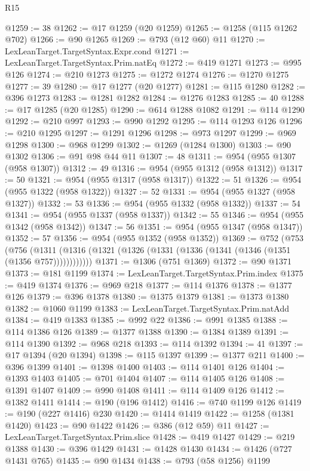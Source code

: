 \begin{lexlean}{R15}
\begin{coremodule}
@1259 := 38
@1262 := @17 @1259 (@20 @1259)
@1265 := @1258 (@115 @1262 @702)
@1266 := @90 @1265
@1269 := @793 (@12 @60) @11
@1270 := LexLeanTarget.TargetSyntax.Expr.cond
@1271 := LexLeanTarget.TargetSyntax.Prim.natEq
@1272 := @419 @1271
@1273 := @995 @126
@1274 := @210 @1273
@1275 := @1272 @1274
@1276 := @1270 @1275
@1277 := 39
@1280 := @17 @1277 (@20 @1277)
@1281 := @115 @1280
@1282 := @396 @1273
@1283 := @1281 @1282
@1284 := @1276 @1283
@1285 := 40
@1288 := @17 @1285 (@20 @1285)
@1290 := @614 @1288 @1082
@1291 := @114 @1290
@1292 := @210 @997
@1293 := @990 @1292
@1295 := @114 @1293 @126
@1296 := @210 @1295
@1297 := @1291 @1296
@1298 := @973 @1297
@1299 := @969 @1298
@1300 := @968 @1299
@1302 := @1269 (@1284 @1300)
@1303 := @90 @1302
@1306 := @91 @98 @44 @11
@1307 := 48
@1311 := @954 (@955 @1307 (@958 @1307))
@1312 := 49
@1316 := @954 (@955 @1312 (@958 @1312))
@1317 := 50
@1321 := @954 (@955 @1317 (@958 @1317))
@1322 := 51
@1326 := @954 (@955 @1322 (@958 @1322))
@1327 := 52
@1331 := @954 (@955 @1327 (@958 @1327))
@1332 := 53
@1336 := @954 (@955 @1332 (@958 @1332))
@1337 := 54
@1341 := @954 (@955 @1337 (@958 @1337))
@1342 := 55
@1346 := @954 (@955 @1342 (@958 @1342))
@1347 := 56
@1351 := @954 (@955 @1347 (@958 @1347))
@1352 := 57
@1356 := @954 (@955 @1352 (@958 @1352))
@1369 := @752
    (@753
      (@756 (@1311 (@1316 (@1321 (@1326 (@1331 (@1336 (@1341 (@1346 (@1351 (@1356 @757))))))))))))
@1371 := @1306 (@751 @1369)
@1372 := @90 @1371
@1373 := @181 @1199
@1374 := LexLeanTarget.TargetSyntax.Prim.index
@1375 := @419 @1374
@1376 := @969 @218
@1377 := @114 @1376
@1378 := @1377 @126
@1379 := @396 @1378
@1380 := @1375 @1379
@1381 := @1373 @1380
@1382 := @1060 @1199
@1383 := LexLeanTarget.TargetSyntax.Prim.natAdd
@1384 := @419 @1383
@1385 := @992 @22
@1386 := @991 @1385
@1388 := @114 @1386 @126
@1389 := @1377 @1388
@1390 := @1384 @1389
@1391 := @114 @1390
@1392 := @968 @218
@1393 := @114 @1392
@1394 := 41
@1397 := @17 @1394 (@20 @1394)
@1398 := @115 @1397
@1399 := @1377 @211
@1400 := @396 @1399
@1401 := @1398 @1400
@1403 := @114 @1401 @126
@1404 := @1393 @1403
@1405 := @701 @1404
@1407 := @114 @1405 @126
@1408 := @1391 @1407
@1409 := @990 @1408
@1411 := @114 @1409 @126
@1412 := @1382 @1411
@1414 := @190 (@196 @1412)
@1416 := @740 @1199 @126
@1419 := @190 (@227 @1416) @230
@1420 := @1414 @1419
@1422 := @1258 (@1381 @1420)
@1423 := @90 @1422
@1426 := @386 (@12 @59) @11
@1427 := LexLeanTarget.TargetSyntax.Prim.slice
@1428 := @419 @1427
@1429 := @219 @1388
@1430 := @396 @1429
@1431 := @1428 @1430
@1434 := @1426 (@727 @1431 @765)
@1435 := @90 @1434
@1438 := @793 (@58 @1256) @1199

\end{coremodule}
\end{lexlean}
